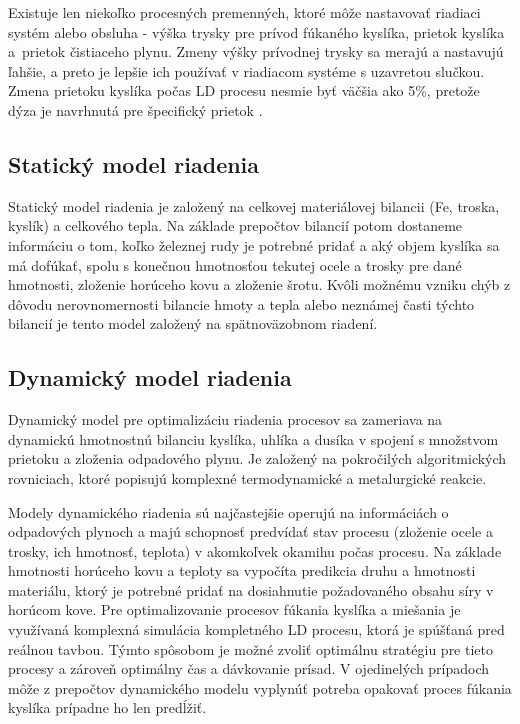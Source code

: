 \documentclass[]{tukediphc}
\begin{document}
Existuje len niekoľko procesných premenných, ktoré môže nastavovať riadiaci systém alebo obsluha - výška trysky pre prívod fúkaného kyslíka, prietok kyslíka a~prietok čistiaceho plynu. Zmeny výšky prívodnej trysky sa merajú a nastavujú ľahšie, a preto je lepšie ich používať v riadiacom systéme s uzavretou slučkou. Zmena prietoku kyslíka počas LD procesu nesmie byť väčšia ako 5\%, pretože dýza je navrhnutá pre špecifický prietok \cite{Widlund1998}.

\subsection{Statický model riadenia}

Statický model riadenia je založený na celkovej materiálovej bilancii (Fe, troska, kyslík) a celkového tepla. Na základe prepočtov bilancií potom dostaneme informáciu o tom, koľko železnej rudy je potrebné pridať a aký objem kyslíka sa má dofúkať, spolu s konečnou hmotnosťou tekutej ocele a trosky pre dané hmotnosti, zloženie horúceho kovu a zloženie šrotu. Kvôli možnému vzniku chýb z dôvodu nerovnomernosti bilancie hmoty a tepla alebo neznámej časti týchto bilancií je tento model založený na spätnoväzobnom riadení.

\subsection{Dynamický model riadenia}

Dynamický model pre optimalizáciu riadenia procesov sa zameriava na dynamickú hmotnostnú bilanciu kyslíka, uhlíka a dusíka v spojení s množstvom prietoku a zloženia odpadového plynu. Je založený na pokročilých algoritmických rovniciach, ktoré popisujú komplexné termodynamické a metalurgické reakcie. 

Modely dynamického riadenia sú najčastejšie operujú na informáciách o odpadových plynoch a majú schopnosť predvídať stav procesu (zloženie ocele a trosky, ich hmotnosť, teplota) v akomkoľvek okamihu počas procesu. Na základe hmotnosti horúceho kovu a teploty sa vypočíta predikcia druhu a hmotnosti materiálu, ktorý je potrebné pridať na dosiahnutie požadovaného obsahu síry v horúcom kove. Pre optimalizovanie procesov fúkania kyslíka a miešania je využívaná komplexná simulácia kompletného LD procesu, ktorá je spúšťaná pred reálnou tavbou. Týmto spôsobom je možné zvoliť optimálnu stratégiu pre tieto procesy a zároveň optimálny čas a dávkovanie prísad. V ojedinelých prípadoch môže z prepočtov dynamického modelu vyplynúť potreba opakovať proces fúkania kyslíka prípadne ho len predĺžiť.
\end{document}
